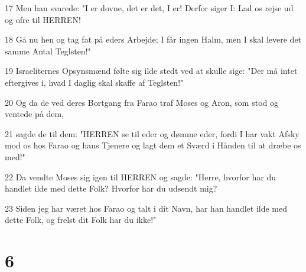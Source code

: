 \par 17 Men han svarede: "I er dovne, det er det, I er! Derfor siger I: Lad os rejse ud og ofre til HERREN!
\par 18 Gå nu hen og tag fat på eders Arbejde; I får ingen Halm, men I skal levere det samme Antal Teglsten!"
\par 19 Israeliternes Opsynsmænd følte sig ilde stedt ved at skulle sige: "Der må intet eftergives i, hvad I daglig skal skaffe af Teglsten!"
\par 20 Og da de ved deres Bortgang fra Farao traf Moses og Aron, som stod og ventede på dem,
\par 21 sagde de til dem: "HERREN se til eder og dømme eder, fordi I har vakt Afsky mod os hos Farao og hans Tjenere og lagt dem et Sværd i Hånden til at dræbe os med!"
\par 22 Da vendte Moses sig igen til HERREN og sagde: "Herre, hvorfor har du handlet ilde med dette Folk? Hvorfor har du udsendt mig?
\par 23 Siden jeg har været hos Farao og talt i dit Navn, har han handlet ilde med dette Folk, og frelst dit Folk har du ikke!"

\chapter{6}

